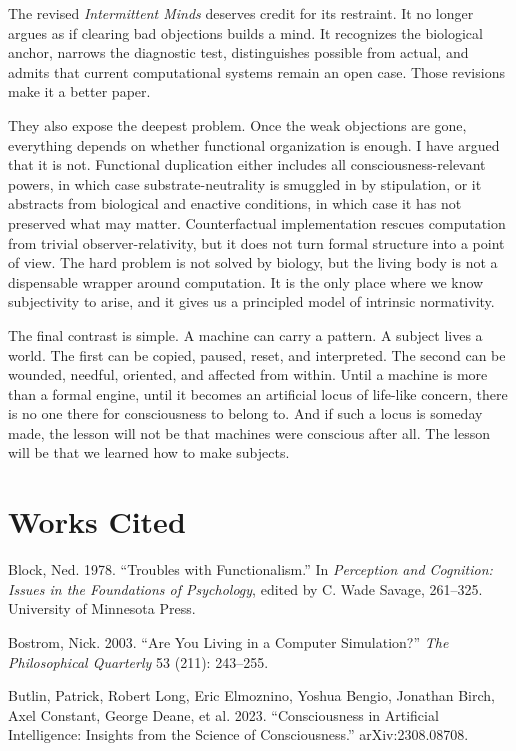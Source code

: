 \documentclass[11pt]{article}
\begin{document}
The revised \emph{Intermittent Minds} deserves credit for its restraint. It no longer argues as if clearing bad objections builds a mind. It recognizes the biological anchor, narrows the diagnostic test, distinguishes possible from actual, and admits that current computational systems remain an open case. Those revisions make it a better paper.

They also expose the deepest problem. Once the weak objections are gone, everything depends on whether functional organization is enough. I have argued that it is not. Functional duplication either includes all consciousness-relevant powers, in which case substrate-neutrality is smuggled in by stipulation, or it abstracts from biological and enactive conditions, in which case it has not preserved what may matter. Counterfactual implementation rescues computation from trivial observer-relativity, but it does not turn formal structure into a point of view. The hard problem is not solved by biology, but the living body is not a dispensable wrapper around computation. It is the only place where we know subjectivity to arise, and it gives us a principled model of intrinsic normativity.

The final contrast is simple. A machine can carry a pattern. A subject lives a world. The first can be copied, paused, reset, and interpreted. The second can be wounded, needful, oriented, and affected from within. Until a machine is more than a formal engine, until it becomes an artificial locus of life-like concern, there is no one there for consciousness to belong to. And if such a locus is someday made, the lesson will not be that machines were conscious after all. The lesson will be that we learned how to make subjects.

\section*{Works Cited}

Block, Ned. 1978. ``Troubles with Functionalism.'' In \emph{Perception and Cognition: Issues in the Foundations of Psychology}, edited by C. Wade Savage, 261--325. University of Minnesota Press.

Bostrom, Nick. 2003. ``Are You Living in a Computer Simulation?'' \emph{The Philosophical Quarterly} 53 (211): 243--255.

Butlin, Patrick, Robert Long, Eric Elmoznino, Yoshua Bengio, Jonathan Birch, Axel Constant, George Deane, et al. 2023. ``Consciousness in Artificial Intelligence: Insights from the Science of Consciousness.'' arXiv:2308.08708.
\end{document}
